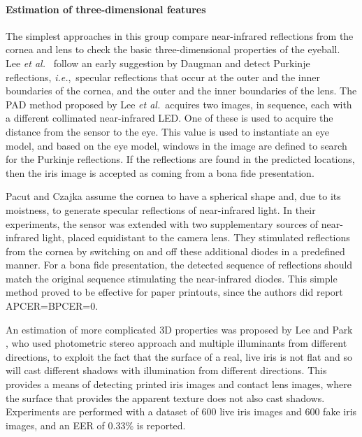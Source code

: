 \documentclass[format=acmsmall, review=false, timestamp=false]{acmart}
\newcommand{\ie}{{\it i.e.},~}
\newcommand{\etal}{{\it et al.}~}
\begin{document}
\paragraph{Estimation of three-dimensional features}

The simplest approaches in this group {compare} near-infrared reflections from the cornea and lens to check the basic three-dimensional properties of the eyeball. Lee \etal \cite{Lee_ICB_2005} {follow an early suggestion by Daugman} and detect Purkinje reflections, \ie specular reflections that occur at the outer and the inner boundaries of the cornea, and the outer and the inner boundaries of the lens. The PAD method proposed by Lee \etal acquires two images, in sequence, each with a different collimated near-infrared LED. One of these is used to acquire the distance from the sensor to the eye. This value is used to instantiate an eye model, and based on the eye model, windows in the image are defined to search for the Purkinje reflections. If the reflections are found in the {predicted} locations, then the iris image is accepted as coming from a bona fide presentation. 

Pacut and Czajka \cite{Pacut_ICCST_2006,Czajka_SPIE_2007} assume the cornea to have a spherical shape and, due to its moistness, to generate specular reflections of {near-infrared} light. In their experiments, the sensor was extended with two supplementary sources of {near-infrared} light, placed equidistant to the camera lens. They stimulated reflections from the cornea by switching on and off these additional diodes in a predefined manner. For a bona fide presentation, the detected sequence of reflections should match the original sequence stimulating the {near-infrared} diodes. This simple method proved to be effective for paper printouts, since the authors did {report APCER=}BPCER=0.

An estimation of more complicated 3D properties {was} proposed by Lee and Park \cite{Lee_IMA_2010}, who used photometric stereo approach and multiple illuminants from different directions, to exploit the fact that the surface of a real, live iris is not flat and so will cast different shadows with illumination from different directions. This provides a means of detecting printed iris images and contact lens images, where the surface that provides the apparent texture does not also cast shadows. Experiments are performed with a dataset of 600 live iris images and 600 fake iris images, and an EER of 0.33\% is reported. 
\end{document}

